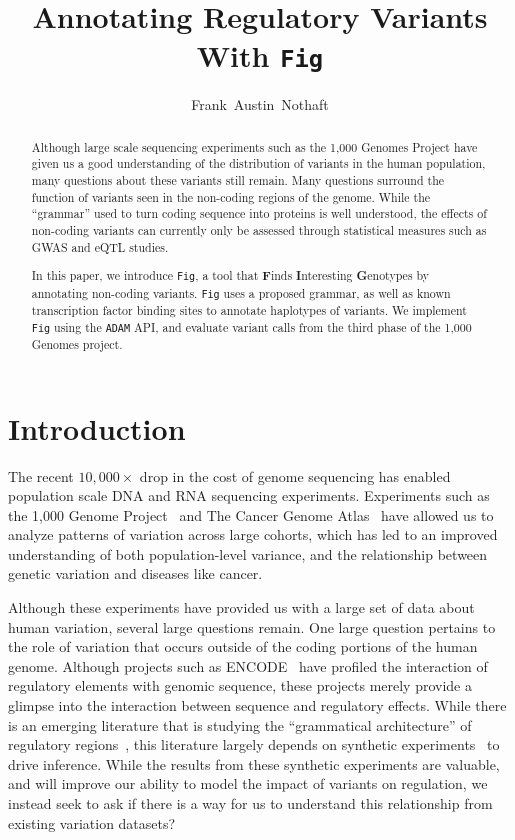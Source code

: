\documentclass[11pt]{article}
\date{}
\theoremstyle{plain}
\begin{document}
\title{Annotating Regulatory Variants With \texttt{Fig}}
\author{Frank~Austin~Nothaft}
\maketitle

\begin{abstract}
Although large scale sequencing experiments such as the 1,000 Genomes Project have given
us a good understanding of the distribution of variants in the human population, many
questions about these variants still remain. Many questions surround the function of
variants seen in the non-coding regions of the genome. While the ``grammar'' used to
turn coding sequence into proteins is well understood, the effects of non-coding variants
can currently only be assessed through statistical measures such as GWAS and eQTL studies.

In this paper, we introduce \texttt{Fig}, a tool that \textbf{F}inds \textbf{I}nteresting
\textbf{G}enotypes by annotating non-coding variants. \texttt{Fig} uses a proposed grammar,
as well as known transcription factor binding sites to annotate haplotypes of variants.
We implement \texttt{Fig} using the \texttt{ADAM} API, and evaluate variant calls from the
third phase of the 1,000 Genomes project.
\end{abstract}

\section{Introduction}
\label{sec:introduction}

The recent $10,000\times$ drop in the cost of genome sequencing has enabled population
scale DNA and RNA sequencing experiments. Experiments such as the 1,000 Genome
Project~\cite{100012} and The Cancer Genome Atlas~\cite{cancer13} have allowed us to
analyze patterns of variation across large cohorts, which has led to an improved
understanding of both population-level variance, and the relationship between genetic
variation and diseases like cancer.

Although these experiments have provided us with a large set of data about human variation,
several large questions remain. One large question pertains to the role of variation
that occurs outside of the coding portions of the human genome. Although projects
such as ENCODE~\cite{gerstein12} have profiled the interaction of regulatory elements
with genomic sequence, these projects merely provide a glimpse into the interaction
between sequence and regulatory effects. While there is an emerging literature that
is studying the ``grammatical architecture'' of regulatory regions~\cite{levo14,
weingarten14}, this literature largely depends on synthetic experiments~\cite{sharon12}
to drive inference. While the results from these synthetic experiments are valuable, and
will improve our ability to model the impact of variants on regulation, we instead
seek to ask if there is a way for us to understand this relationship from existing
variation datasets?
\end{document}
